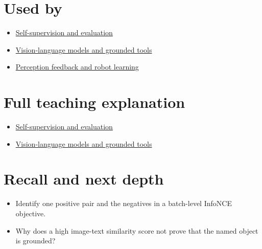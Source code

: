 \section{Used by}\label{appendix-772f1fd96148-used-by}

\begin{itemize}
\tightlist
\item
  \href{Continuous\%20Notes/University\%20-\%20Worlds,\%20Images\%20and\%20Inference\%20-\%20Graphics,\%20Vision\%20and\%20Photography\#Self-supervision\%20and\%20evaluation}{Self-supervision and evaluation}
\item
  \href{Continuous\%20Notes/University\%20-\%20Worlds,\%20Images\%20and\%20Inference\%20-\%20Graphics,\%20Vision\%20and\%20Photography\#Vision-language\%20models\%20and\%20grounded\%20tools}{Vision-language models and grounded tools}
\item
  \hyperref[appendix-b0c42da325f1]{Perception feedback and robot learning}
\end{itemize}

\section{Full teaching explanation}\label{appendix-772f1fd96148-full-teaching-explanation}

\begin{itemize}
\tightlist
\item
  \href{Continuous\%20Notes/University\%20-\%20Worlds,\%20Images\%20and\%20Inference\%20-\%20Graphics,\%20Vision\%20and\%20Photography\#Self-supervision\%20and\%20evaluation}{Self-supervision and evaluation}
\item
  \href{Continuous\%20Notes/University\%20-\%20Worlds,\%20Images\%20and\%20Inference\%20-\%20Graphics,\%20Vision\%20and\%20Photography\#Vision-language\%20models\%20and\%20grounded\%20tools}{Vision-language models and grounded tools}
\end{itemize}

\section{Recall and next depth}\label{appendix-772f1fd96148-recall-and-next-depth}

\begin{itemize}
\tightlist
\item
  Identify one positive pair and the negatives in a batch-level InfoNCE objective.
\item
  Why does a high image-text similarity score not prove that the named object is grounded?
\end{itemize}

